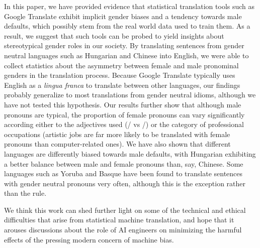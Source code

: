 \documentclass{article}
\begin{document}
In this paper, we have provided evidence that statistical translation tools such as Google Translate exhibit implicit gender biases and a tendency towards male defaults, which possibly stem from the real world data used to train them. As a result, we suggest that such tools can be probed to yield insights about stereotypical gender roles in our society. By translating sentences from gender neutral languages such as Hungarian and Chinese into English, we were able to collect statistics about the asymmetry between female and male pronominal genders in the translation process. Because Google Translate typically uses English as a \emph{lingua franca} to translate between other languages, our findings probably generalize to most translations from gender neutral idioms, although we have not tested this hypothesis. Our results further show that although male pronouns are typical, the proportion of female pronouns can vary significantly according either to the adjectives used (/ vs /) or the category of professional occupations (artistic jobs are far more likely to be translated with female pronouns than computer-related ones). We have also shown that different languages are differently biased towards male defaults, with Hungarian exhibiting a better balance between male and female pronouns than, say, Chinese. Some languages such as Yoruba and Basque have been found to translate sentences with gender neutral pronouns very often, although this is the exception rather than the rule.

We think this work can shed further light on some of the technical and ethical difficulties that arise from statistical machine translation, and hope that it arouses discussions about the role of AI engineers on minimizing the harmful effects of the pressing modern concern of machine bias.

\clearpage


\end{document}

